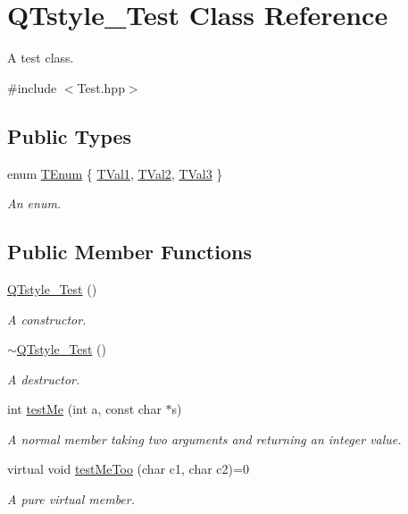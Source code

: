 \hypertarget{classQTstyle__Test}{\section{Q\-Tstyle\-\_\-\-Test Class Reference}
\label{classQTstyle__Test}
}


A test class.  




{\ttfamily \#include $<$Test.\-hpp$>$}

\subsection*{Public Types}
\begin{DoxyCompactItemize}
\item 
enum \hyperlink{classQTstyle__Test_a0525f798cda415a94fedeceb806d2c49}{T\-Enum} \{ \hyperlink{classQTstyle__Test_a0525f798cda415a94fedeceb806d2c49a7929af91f99c319ffe2e49c9632bc3fa}{T\-Val1}, 
\hyperlink{classQTstyle__Test_a0525f798cda415a94fedeceb806d2c49afff89db6859123549579806212d9fd80}{T\-Val2}, 
\hyperlink{classQTstyle__Test_a0525f798cda415a94fedeceb806d2c49a8227cd0f0c1285d59ff14376fcd00f85}{T\-Val3}
 \}
\begin{DoxyCompactList}\small\item\em An enum. \end{DoxyCompactList}\end{DoxyCompactItemize}
\subsection*{Public Member Functions}
\begin{DoxyCompactItemize}
\item 
\hyperlink{classQTstyle__Test_a14a296ea4e2ad446712f2310bec60766}{Q\-Tstyle\-\_\-\-Test} ()
\begin{DoxyCompactList}\small\item\em A constructor. \end{DoxyCompactList}\item 
\hyperlink{classQTstyle__Test_a7e82397d534d9a867f0857da01a46e9e}{$\sim$\-Q\-Tstyle\-\_\-\-Test} ()
\begin{DoxyCompactList}\small\item\em A destructor. \end{DoxyCompactList}\item 
int \hyperlink{classQTstyle__Test_a8840748753118dd468e8368a28e49c62}{test\-Me} (int a, const char $\ast$s)
\begin{DoxyCompactList}\small\item\em A normal member taking two arguments and returning an integer value. \end{DoxyCompactList}\item 
virtual void \hyperlink{classQTstyle__Test_ad5b201f097a720d44bf976c2f27efbda}{test\-Me\-Too} (char c1, char c2)=0
\begin{DoxyCompactList}\small\item\em A pure virtual member. \end{DoxyCompactList}\end{DoxyCompactItemize}
